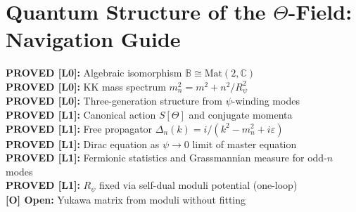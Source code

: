 %


\section{Quantum Structure of the \texorpdfstring{$\Theta$}{Theta}-Field: Navigation Guide}
\label{sec:bridges:theta_quantum}

\begin{tcolorbox}[colback=blue!5!white,colframe=blue!50!black,title=Θ-Field Quantum Structure Summary]
\textbf{PROVED [L0]:} Algebraic isomorphism $\mathbb{B}\cong\mathrm{Mat}(2,\mathbb{C})$ \\
\textbf{PROVED [L0]:} KK mass spectrum $m_n^2 = m^2 + n^2/R_\psi^2$ \\
\textbf{PROVED [L0]:} Three-generation structure from $\psi$-winding modes \\
\textbf{PROVED [L1]:} Canonical action $S[\Theta]$ and conjugate momenta \\
\textbf{PROVED [L1]:} Free propagator $\Delta_n(k) = i/(k^2 - m_n^2 + i\varepsilon)$ \\
\textbf{PROVED [L1]:} Dirac equation as $\psi\to 0$ limit of master equation \\
\textbf{PROVED [L1]:} Fermionic statistics and Grassmannian measure for odd-$n$ modes \\
\textbf{PROVED [L1]:} $R_\psi$ fixed via self-dual moduli potential (one-loop) \\
\textbf{[O] Open:} Yukawa matrix from moduli without fitting
\end{tcolorbox}

